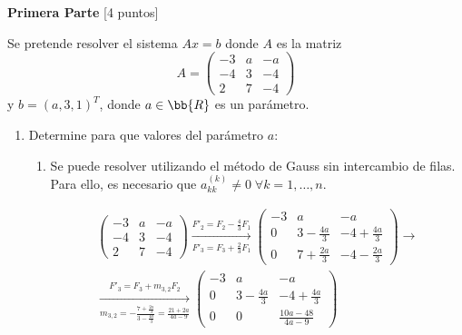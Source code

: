 \documentclass[12pt]{article}
\begin{document}
    \textbf{Primera Parte} [4 puntos]
\begin{ejercicio}
    Se pretende resolver el sistema $Ax = b$ donde $A$ es la matriz
    \begin{equation*}
        A=\left( \begin{array}{ccc}
            -3 & a & -a \\
            -4 & 3 & -4 \\
            2 & 7 & -4
        \end{array} \right)
    \end{equation*}
    y $b = (a, 3, 1)^T $, donde $a\in \bb{R}$ es un parámetro.

    \begin{enumerate}
        \item Determine para que valores del parámetro $a$:
        \begin{enumerate}
            \item Se puede resolver utilizando el método de Gauss sin intercambio de filas.\\

            Para ello, es necesario que $a_{kk}^{(k)}\neq 0 \;\forall k=1,\dots, n$.

            \begin{multline*}
                \left( \begin{array}{ccc}
                    -3 & a & -a \\
                    -4 & 3 & -4 \\
                    2 & 7 & -4
                \end{array} \right)
                \xrightarrow[F'_3=F_3 +\frac{2}{3}F_1]{F'_2=F_2 -\frac{4}{3}F_1}
                \left( \begin{array}{ccc}
                    -3 & a & -a \\
                    0 & 3-\frac{4a}{3} & -4+\frac{4a}{3} \\
                    0 & 7+\frac{2a}{3} & -4-\frac{2a}{3}
                \end{array} \right)
                \longrightarrow \\
                \xrightarrow[m_{3,2}=-\frac{7+\frac{2a}{3}}{3-\frac{4a}{3}} = \frac{21+2a}{4a-9}]{F'_3=F_3 +m_{3,2}F_2}
                \left( \begin{array}{ccc}
                    -3 & a & -a \\
                    0 & 3-\frac{4a}{3} & -4+\frac{4a}{3} \\
                    0 & 0 & \frac{10a-48}{4a-9}
                \end{array} \right)
            \end{multline*}


\end{enumerate}
\end{enumerate}
\end{ejercicio}
\end{document}
